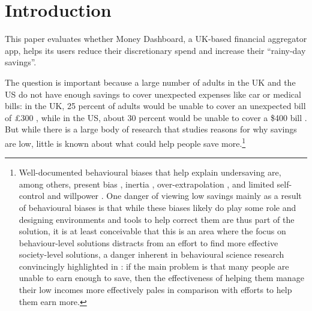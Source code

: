
\section{Introduction}%
\label{sec:introduction}

This paper evaluates whether Money Dashboard, a UK-based financial aggregator
app, helps its users reduce their discretionary spend and increase their
``rainy-day savings''.

The question is important because a large number of adults in the UK and the US
do not have enough savings to cover unexpected expenses like car or medical
bills: in the UK, 25 percent of adults would be unable to cover an unexpected
bill of \pounds300 \citep{philipps2021supporting}, while in the US, about 30
percent would be unable to cover a \$400 bill \citep{fed2022economic}. But
while there is a large body of research that studies reasons for why savings
are low, little is known about what could help people save
more.\footnote{Well-documented behavioural biases that help explain undersaving
    are, among others, present bias \citep{laibson1997golden,
    ericson2019intertemporal}, inertia \citep{madrian2001power},
    over-extrapolation \citep{choi2009reinforcement}, and limited self-control
    and willpower \citep{thaler1981economic, benhabib2005modeling,
    fudenberg2006dual, loewenstein2004animal, gul2001temptation}. One danger of
    viewing low savings mainly as a result of behavioural biases is that while
    these biases likely do play some role and designing environments and tools
    to help correct them are thus part of the solution, it is at least
    conceivable that this is an area where the focus on behaviour-level
    solutions distracts from an effort to find more effective society-level
    solutions, a danger inherent in behavioural science research convincingly
    highlighted in \citet{chater2022frame}: if the main problem is that many
people are unable to earn enough to save, then the effectiveness of helping
them manage their low incomes more effectively pales in comparison with efforts
to help them earn more.}

